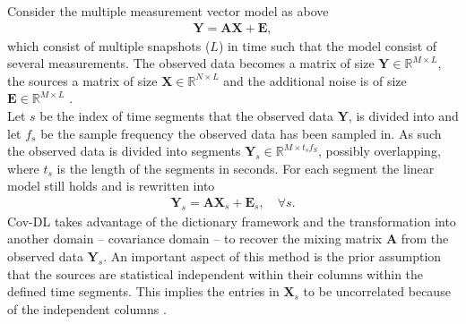 Consider the multiple measurement vector model as above
\begin{align*}
\mathbf{Y} = \mathbf{AX}+\textbf{E},
\end{align*}
which consist of multiple snapshots ($L$) in time such that the model consist of several measurements. The observed data becomes a matrix of size $\mathbf{Y} \in \mathbb{R}^{M \times L}$, the sources a matrix of size $\mathbf{X} \in \mathbb{R}^{N \times L}$ and the additional noise is of size $\mathbf{E} \in \mathbb{R}^{M \times L}$ .
\\
Let $s$ be the index of time segments that the observed data $\mathbf{Y}$, is divided into and let $f_s$ be the sample frequency the observed data has been sampled in. As such the observed data is divided into segments $\mathbf{Y}_s \in \mathbb{R}^{M \times t_s f_S}$, possibly overlapping, where $t_s$ is the length of the segments in seconds. For each segment the linear model still holds and is rewritten into
\begin{align*}
\mathbf{Y}_s = \mathbf{AX}_s + \textbf{E}_s, \quad \forall s.
\end{align*}
Cov-DL takes advantage of the dictionary framework and the transformation into another domain -- covariance domain -- to recover the mixing matrix $\mathbf{A}$ from the observed data $\mathbf{Y}_s$. An important aspect of this method is the prior assumption that the sources are statistical independent within their columns within the defined time segments. This implies the entries in $\textbf{X}_s$ to be uncorrelated because of the independent columns .\\  
